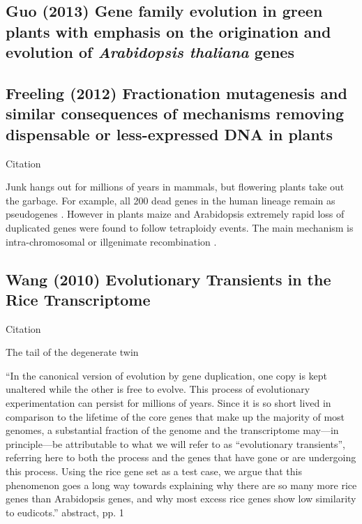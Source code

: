 \subsection{Guo (2013) Gene family evolution in green plants with emphasis on
  the origination and evolution of \textit{Arabidopsis thaliana} genes}

\subsection{Freeling (2012) Fractionation mutagenesis and similar consequences
    of mechanisms removing dispensable or less-expressed {DNA} in plants}

    Citation \cite{freeling_fractionation_2012}

    Junk hangs out for millions of years in mammals, but flowering plants take
    out the garbage. For example, all 200 dead genes in the human lineage
    remain as pseudogenes \cite{schrider_all_2009}. However in plants maize
    \cite{woodhouse_following_2010} and Arabidopsis
    \cite{thomas_following_2006} extremely rapid loss of duplicated genes were
    found to follow tetraploidy events. The main mechanism is intra-chromosomal
    or illgenimate recombination \cite{woodhouse_following_2010}.

\subsection{Wang (2010) Evolutionary Transients in the Rice Transcriptome}

    Citation \cite{wang_evolutionary_2010}

    The tail of the degenerate twin

    ``In the canonical version of evolution by gene duplication, one copy
    is kept unaltered while the other is free to evolve. This process of
    evolutionary experimentation can persist for millions of years. Since
    it is so short lived in comparison to the lifetime of the core genes
    that make up the majority of most genomes, a substantial fraction of
    the genome and the transcriptome may—in principle—be attributable to
    what we will refer to as “evolutionary transients”, referring here to
    both the process and the genes that have gone or are undergoing this
    process. Using the rice gene set as a test case, we argue that this
    phenomenon goes a long way towards explaining why there are so many
    more rice genes than Arabidopsis genes, and why most excess rice genes
    show low similarity to eudicots.'' abstract, pp. 1


